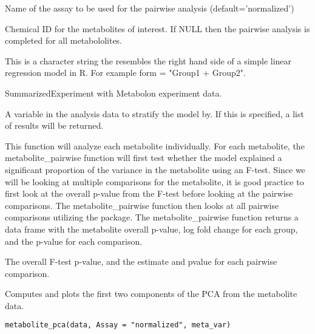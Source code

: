\documentclass[a4paper]{book}
\begin{document}
\begin{Arguments}
\begin{ldescription}
\item[\code{Assay}] Name of the assay to be used for the pairwise analysis (default='normalized')

\item[\code{mets}] Chemical ID for the metabolites of interest. If NULL then the pairwise analysis
is completed for all metabololites.

\item[\code{form:}] This is a character string the resembles the right hand side of a
simple linear regression model in R. For example form = "Group1 + Group2".

\item[\code{data:}] SummarizedExperiment with Metabolon experiment data.

\item[\code{strat\_var:}] A variable in the analysis data to stratify the model by. If this
is specified, a list of results will be returned.
\end{ldescription}
\end{Arguments}
%
\begin{Details}
This function will analyze each metabolite individually. For each metabolite, the metabolite\_pairwise function
will first test whether the model explained a significant proportion
of the variance in the metabolite using an F-test. Since we will be looking at
multiple comparisons for the metabolite, it is good practice to first look at the
overall p-value from the F-test before looking at the pairwise comparisons.
The metabolite\_pairwise function then looks at all pairwise comparisons utilizing
the  package.
The metabolite\_pairwise function returns a data frame with the metabolite overall
p-value, log fold change for each group, and the p-value
for each comparison.
\end{Details}
%
\begin{Value}
The overall F-test p-value, and the estimate and pvalue for each pairwise comparison.
\end{Value}
%
\begin{Description}
Computes and plots the first two components of the PCA from the metabolite data.
\end{Description}
%
\begin{Usage}
\begin{verbatim}
metabolite_pca(data, Assay = "normalized", meta_var)
\end{verbatim}
\end{Usage}
\end{document}
